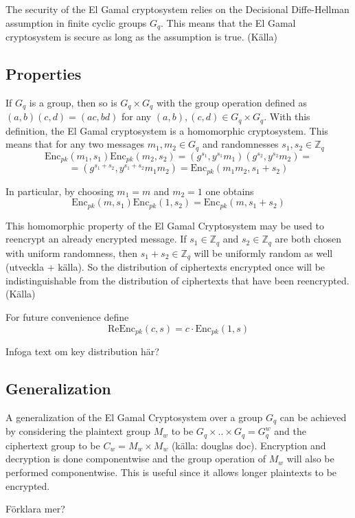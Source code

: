 The security of the El Gamal cryptosystem relies on the Decisional
Diffe-Hellman assumption in finite cyclic groups $G_q$. This means
that the El Gamal cryptosystem is secure as long as the assumption is
true. (Källa)

\subsection{Properties}
If $G_q$ is a group, then so is $G_q \times G_q$ with the group
operation defined as $(a,b)(c,d) = (a c, b d)$
for any $(a,b),(c,d) \in G_q \times G_q$. With this definition, the El Gamal
cryptosystem is a homomorphic cryptosystem. This means that for any
two messages $m_1, m_2 \in G_q$ and randomnesses $s_1, s_2 \in
\mathbb{Z}_q$
$$
 \mathrm{Enc}_{pk}(m_1, s_1)\mathrm{Enc}_{pk}(m_2, s_2) =
(g^{s_1}, y^{s_1}m_1)(g^{s_2},y^{s_2}m_2) =
$$
$$
= (g^{s_1 + s_2}, y^{s_1 + s_2}m_1m_2) = \mathrm{Enc}_{pk}(m_1m_2, s_1 + s_2)
$$

In particular, by choosing $m_1 = m$ and $m_2 = 1$ one obtains
$$
\mathrm{Enc}_{pk}(m, s_1) \mathrm{Enc}_{pk}(1, s_2) = \mathrm{Enc}_{pk}(m, s_1 + s_2)
$$

This homomorphic property of the El Gamal Cryptosystem may be used to
reencrypt an already encrypted message. If $s_1 \in \mathbb{Z}_q$ and
$s_2 \in \mathbb{Z}_q$ are both chosen with uniform randomness, then
$s_1 + s_2 \in \mathbb{Z}_q$ will be uniformly random as well
(utveckla + källa). So the distribution of ciphertexts encrypted once
will be indistinguishable from the distribution of ciphertexts that
have been reencrypted. (Källa)

For future convenience define
$$
\mathrm{ReEnc}_{pk}(c,s) = c \cdot \mathrm{Enc}_{pk}(1,s) 
$$

Infoga text om key distribution här?


\subsection{Generalization}
A generalization of the El Gamal Cryptosystem over a group $G_q$ can
be achieved by considering the plaintext group $M_w$ to be $G_q \times
.. \times G_q = G_q^w$ and the ciphertext group to be $C_w = M_w
\times M_w$ (källa: douglas doc). Encryption and decryption is done
componentwise and the group operation of $M_w$ will also be performed
componentwise. This is useful since it allows longer plaintexts to be
encrypted.
 
Förklara mer?
